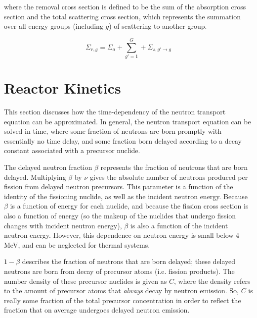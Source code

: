 \documentclass[10pt]{article}
\begin{document}
\begin{flushleft}
where the removal cross section is defined to be the sum of the absorption cross section and the total scattering cross section, which represents the summation over all energy groups (including \(g\)) of scattering to another group. 

\begin{equation}
\label{RemovalCrossSection}
\Sigma_{r,g}=\Sigma_a+\sum_{g'=1}^{G}+\Sigma_{s, g'\rightarrow g}
\end{equation}










\clearpage
\section{Reactor Kinetics}

This section discusses how the time-dependency of the neutron transport equation can be approximated. In general, the neutron transport equation can be solved in time, where some fraction of neutrons are born promptly with essentially no time delay, and some fraction born delayed according to a decay constant associated with a precursor nuclide. 

The delayed neutron fraction \(\beta\) represents the fraction of neutrons that are born delayed. Multiplying \(\beta\) by \(\nu\) gives the absolute number of neutrons produced per fission from delayed neutron precursors. This parameter is a function of the identity of the fissioning nuclide, as well as the incident neutron energy. Because \(\beta\) is a function of energy for each nuclide, and because the fission cross section is also a function of energy (so the makeup of the nuclides that undergo fission changes with incident neutron energy), \(\beta\) is also a function of the incident neutron energy. However, this dependence on neutron energy is small below 4 MeV, and can be neglected for thermal systems.

\(1-\beta\) describes the fraction of neutrons that are born delayed; these delayed neutrons are born from decay of precursor atoms (i.e. fission products). The number density of these precursor nuclides is given as \(C\), where the density refers to the amount of precursor atoms that {\it always} decay by neutron emission. So, \(C\) is really some fraction of the total precursor concentration in order to reflect the fraction that on average undergoes delayed neutron emission. 


\end{flushleft}
\end{document}
